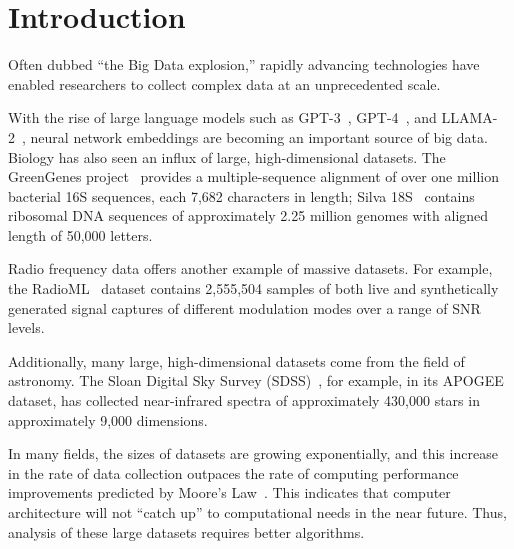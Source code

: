 \section{Introduction}
\label{sec:introduction}

Often dubbed ``the Big Data explosion,'' rapidly advancing technologies have enabled researchers to collect complex data at an unprecedented scale. 


With the rise of large language models such as GPT-3~\cite{2020arXiv200514165B}, GPT-4~\cite{OpenAI2023GPT4TR}, and LLAMA-2~\cite{Touvron2023Llama2O}, neural network embeddings are becoming an important source of big data. 
Biology has also seen an influx of large, high-dimensional datasets.
The GreenGenes project~\cite{desantis2006greengenes} provides a multiple-sequence alignment of over one million bacterial 16S sequences, each 7,682 characters in length;
Silva 18S~\cite{10.1093/nar/gks1219} contains ribosomal DNA sequences of approximately 2.25 million genomes with aligned length of 50,000 letters.


Radio frequency data offers another example of massive datasets. 
For example, the RadioML~\cite{oshea2018radioml} dataset contains 2,555,504 samples of both live and synthetically generated signal captures of different modulation modes over a range of SNR levels.


Additionally, many large, high-dimensional datasets come from the field of astronomy. The Sloan Digital Sky Survey (SDSS)~\cite{blanton2017sdss}, for example, in its APOGEE~\cite{alam2015eleventh} dataset, has collected near-infrared spectra of approximately 430,000 stars in approximately 9,000 dimensions. 



In many fields, the sizes of datasets are growing exponentially, and this increase in the rate of data collection outpaces the rate of computing performance improvements predicted by Moore's Law~\cite{brescia2012extracting}.
This indicates that computer architecture will not ``catch up'' to computational needs in the near future.
Thus, analysis of these large datasets requires better algorithms.


